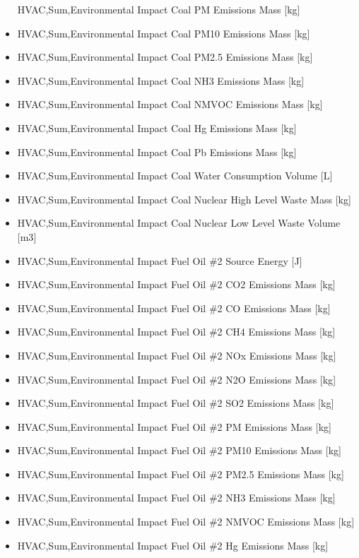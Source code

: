 \begin{itemize}
  HVAC,Sum,Environmental Impact Coal PM Emissions Mass {[}kg{]}
\item
  HVAC,Sum,Environmental Impact Coal PM10 Emissions Mass {[}kg{]}
\item
  HVAC,Sum,Environmental Impact Coal PM2.5 Emissions Mass {[}kg{]}
\item
  HVAC,Sum,Environmental Impact Coal NH3 Emissions Mass {[}kg{]}
\item
  HVAC,Sum,Environmental Impact Coal NMVOC Emissions Mass {[}kg{]}
\item
  HVAC,Sum,Environmental Impact Coal Hg Emissions Mass {[}kg{]}
\item
  HVAC,Sum,Environmental Impact Coal Pb Emissions Mass {[}kg{]}
\item
  HVAC,Sum,Environmental Impact Coal Water Consumption Volume {[}L{]}
\item
  HVAC,Sum,Environmental Impact Coal Nuclear High Level Waste Mass {[}kg{]}
\item
  HVAC,Sum,Environmental Impact Coal Nuclear Low Level Waste Volume {[}m3{]}
\item
  HVAC,Sum,Environmental Impact Fuel Oil \#2 Source Energy {[}J{]}
\item
  HVAC,Sum,Environmental Impact Fuel Oil \#2 CO2 Emissions Mass {[}kg{]}
\item
  HVAC,Sum,Environmental Impact Fuel Oil \#2 CO Emissions Mass {[}kg{]}
\item
  HVAC,Sum,Environmental Impact Fuel Oil \#2 CH4 Emissions Mass {[}kg{]}
\item
  HVAC,Sum,Environmental Impact Fuel Oil \#2 NOx Emissions Mass {[}kg{]}
\item
  HVAC,Sum,Environmental Impact Fuel Oil \#2 N2O Emissions Mass {[}kg{]}
\item
  HVAC,Sum,Environmental Impact Fuel Oil \#2 SO2 Emissions Mass {[}kg{]}
\item
  HVAC,Sum,Environmental Impact Fuel Oil \#2 PM Emissions Mass {[}kg{]}
\item
  HVAC,Sum,Environmental Impact Fuel Oil \#2 PM10 Emissions Mass {[}kg{]}
\item
  HVAC,Sum,Environmental Impact Fuel Oil \#2 PM2.5 Emissions Mass {[}kg{]}
\item
  HVAC,Sum,Environmental Impact Fuel Oil \#2 NH3 Emissions Mass {[}kg{]}
\item
  HVAC,Sum,Environmental Impact Fuel Oil \#2 NMVOC Emissions Mass {[}kg{]}
\item
  HVAC,Sum,Environmental Impact Fuel Oil \#2 Hg Emissions Mass {[}kg{]}

\end{itemize}
